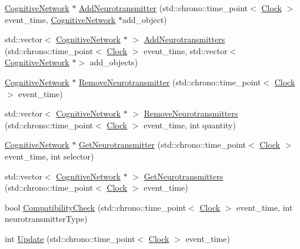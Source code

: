 \begin{DoxyCompactItemize}
\item 
\mbox{\hyperlink{classCognitiveNetwork}{Cognitive\+Network}} $\ast$ \mbox{\hyperlink{classMembraneChannel_ae483c6bc45f73390070b824296762d4c}{Add\+Neurotransmitter}} (std\+::chrono\+::time\+\_\+point$<$ \mbox{\hyperlink{universe_8h_a0ef8d951d1ca5ab3cfaf7ab4c7a6fd80}{Clock}} $>$ event\+\_\+time, \mbox{\hyperlink{classCognitiveNetwork}{Cognitive\+Network}} $\ast$add\+\_\+object)
\item 
std\+::vector$<$ \mbox{\hyperlink{classCognitiveNetwork}{Cognitive\+Network}} $\ast$ $>$ \mbox{\hyperlink{classMembraneChannel_a01fb5f3176cfa3423bb10a04bf69da01}{Add\+Neurotransmitters}} (std\+::chrono\+::time\+\_\+point$<$ \mbox{\hyperlink{universe_8h_a0ef8d951d1ca5ab3cfaf7ab4c7a6fd80}{Clock}} $>$ event\+\_\+time, std\+::vector$<$ \mbox{\hyperlink{classCognitiveNetwork}{Cognitive\+Network}} $\ast$$>$ add\+\_\+objects)
\item 
\mbox{\hyperlink{classCognitiveNetwork}{Cognitive\+Network}} $\ast$ \mbox{\hyperlink{classMembraneChannel_a2252f222f4a41bf1975dc856569e0a22}{Remove\+Neurotransmitter}} (std\+::chrono\+::time\+\_\+point$<$ \mbox{\hyperlink{universe_8h_a0ef8d951d1ca5ab3cfaf7ab4c7a6fd80}{Clock}} $>$ event\+\_\+time)
\item 
std\+::vector$<$ \mbox{\hyperlink{classCognitiveNetwork}{Cognitive\+Network}} $\ast$ $>$ \mbox{\hyperlink{classMembraneChannel_a37f22ddd877e3be7b353048149a7bbcd}{Remove\+Neurotransmitters}} (std\+::chrono\+::time\+\_\+point$<$ \mbox{\hyperlink{universe_8h_a0ef8d951d1ca5ab3cfaf7ab4c7a6fd80}{Clock}} $>$ event\+\_\+time, int quantity)
\item 
\mbox{\hyperlink{classCognitiveNetwork}{Cognitive\+Network}} $\ast$ \mbox{\hyperlink{classMembraneChannel_a91ce6506a8e82905de7cd031ed5d63f5}{Get\+Neurotransmitter}} (std\+::chrono\+::time\+\_\+point$<$ \mbox{\hyperlink{universe_8h_a0ef8d951d1ca5ab3cfaf7ab4c7a6fd80}{Clock}} $>$ event\+\_\+time, int selector)
\item 
std\+::vector$<$ \mbox{\hyperlink{classCognitiveNetwork}{Cognitive\+Network}} $\ast$ $>$ \mbox{\hyperlink{classMembraneChannel_a9fdb20eb7d3f9ebad864d07aaa835716}{Get\+Neurotransmitters}} (std\+::chrono\+::time\+\_\+point$<$ \mbox{\hyperlink{universe_8h_a0ef8d951d1ca5ab3cfaf7ab4c7a6fd80}{Clock}} $>$ event\+\_\+time)
\item 
bool \mbox{\hyperlink{classMembraneChannel_a67496ca67ad3ecae38f6b987547b1b99}{Compatibility\+Check}} (std\+::chrono\+::time\+\_\+point$<$ \mbox{\hyperlink{universe_8h_a0ef8d951d1ca5ab3cfaf7ab4c7a6fd80}{Clock}} $>$ event\+\_\+time, int neurotransmitter\+Type)
\item 
int \mbox{\hyperlink{classMembraneChannel_a34077828eee1c2457212f05217b09d6c}{Update}} (std\+::chrono\+::time\+\_\+point$<$ \mbox{\hyperlink{universe_8h_a0ef8d951d1ca5ab3cfaf7ab4c7a6fd80}{Clock}} $>$ event\+\_\+time)
\end{DoxyCompactItemize}

